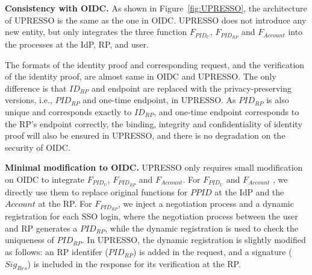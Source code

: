 \vspace{1mm}\noindent \textbf{Consistency with OIDC.}
As shown in Figure~\ref{fig:UPRESSO}, the architecture of UPRESSO is the same as the one in OIDC. UPRESSO does not introduce any new entity, but only integrates the three function $F_{PID_U}$, $F_{PID_{RP}}$ and $F_{Account}$ into the processes at the IdP, RP, and user.

The formats of the  identity proof and corresponding request, and the verification of the identity proof,  are almost same in OIDC and UPRESSO. 
The only difference is that $ID_{RP}$ and endpoint are replaced with the privacy-preserving versions, i.e., $PID_{RP}$ and one-time endpoint, in UPRESSO.
As $PID_{RP}$ is also unique and corresponds exactly to $ID_{RP}$, and one-time endpoint corresponds to the RP's endpoint correctly,
 the binding, integrity and confidentiality of identity proof will also be ensured in UPRESSO, and there is no degradation on the security of OIDC. 

\vspace{1mm}\noindent \textbf{Minimal modification to OIDC.}
UPRESSO only requires small modification on OIDC to integrate $F_{PID_U}$, $F_{PID_{RP}}$ and $F_{Account}$. 
For $F_{PID_U}$ and $F_{Account}$ , we directly use them to replace original functions for $PPID$ at the IdP and the $Account$ at the RP.
For $F_{PID_{RP}}$, we inject a negotiation process and a dynamic registration for each SSO login,
 where the negotiation process between the user and RP generates a $PID_{RP}$,
  while the dynamic registration is used to check the uniqueness of $PID_{RP}$.
In UPRESSO, the dynamic registration is slightly modified as follows: an RP identifer ($PID_{RP}$)  is added in the request, and a signature ($Sig_{Res}$)  is included in the response for its verification at the RP.
 
   



